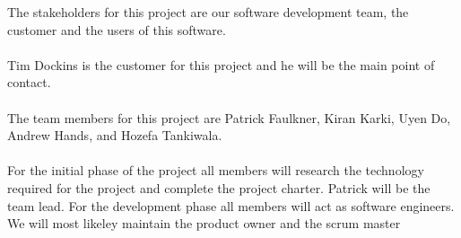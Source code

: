 
 The stakeholders for this project are our software development team, the customer and the users of this software.\\ 
 \\ Tim Dockins is the customer for this project and he will be the main point of contact.\\
\\The team members for this project are Patrick Faulkner, Kiran Karki, Uyen Do, Andrew Hands, and Hozefa Tankiwala.\\ 
 \\For the initial phase of the project all members will research the technology required for the project and complete the project charter.
 Patrick will be the team lead.
 For the development phase all members will act as software engineers.
 We will most likeley maintain the product owner and the scrum master
 
 
 